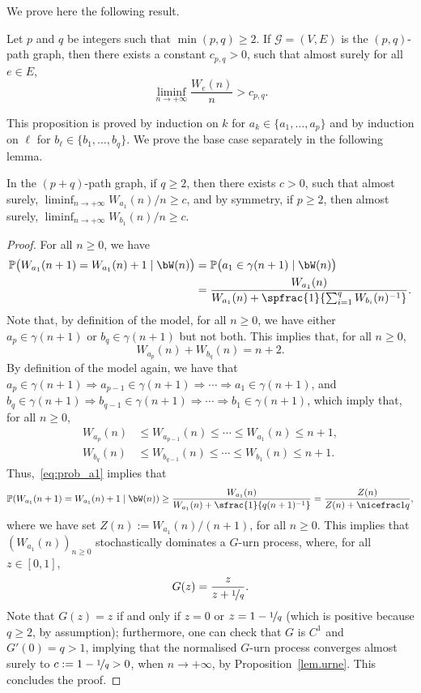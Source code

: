 \label{subsec.2paths.1}
We prove here the following result.

\begin{proposition}\label{prop:multiedges}
Let $p$ and $q$ be integers such that $\min(p, q)\geq 2$.
If $\mathcal G = (V,E)$ is the $(p,q)$-path graph, then there exists a constant $c_{p,q}>0$, such that almost surely for all $e\in E$,
\[
\liminf_{n\to +\infty} \frac{W_e(n)}n> c_{p,q}.
\]
\end{proposition}
This proposition is proved by induction on $k$ for $a_k\in \{a_1, \ldots, a_p\}$ and by induction on $\ell$ for $b_\ell\in \{b_1, \ldots, b_q\}$. We prove the base case separately in the following lemma.
\begin{lemma}\label{lem:liminf_a1}
In the $(p+q)$-path graph, if $q\geq 2$, then there exists $c>0$, such that almost surely, $\liminf_{n\to+\infty} W_{a_1}(n)/n\ge c$, and by symmetry, if $p\geq 2$, then almost surely, $\liminf_{n\to+\infty} W_{b_1}(n)/n\ge c$.
\end{lemma}

\begin{proof}
For all $n\geq 0$, we have
\begin{equation}
\begin{aligned}\label{eq:prob_a1}
\mathbb P\bigl(W_{a_1}(n+1) = W_{a_1}(n)+1 \mid \bW(n)\bigr)
&=\mathbb P\bigl(a_1 \in \gamma(n+1)\mid \bW(n)\bigr)\\
&= \frac{W_{a_1}(n)}{W_{a_1}(n)+
\spfrac{1}{\sum_{i=1}^q W_{b_i}(n)^{-1}}}.
\end{aligned}
\end{equation}
Note that, by definition of the model,
for all $n\geq 0$,
we have either $a_p\in\gamma(n+1)$ or $b_q\in\gamma(n+1)$ but not both.
This implies that, for all $n\geq 0$,
\[
W_{a_p}(n)+W_{b_q}(n)=n+2.
\]
By definition of the model again,
we have that $a_p\in\gamma(n+1)\Rightarrow a_{p-1}\in \gamma(n+1) \Rightarrow \cdots \Rightarrow a_1\in\gamma(n+1)$, and
$b_q\in\gamma(n+1)\Rightarrow b_{q-1}\in\gamma(n+1)\Rightarrow \cdots \Rightarrow b_1\in\gamma(n+1)$, which imply that, for all $n\geq 0$,
\begin{align*}
W_{a_p}(n)&\leq W_{a_{p-1}}(n)\leq \cdots \leq W_{a_1}(n)\leq n+1,\\
\tag*{and}
W_{b_q}(n)&\leq W_{b_{q-1}}(n)\leq\cdots \leq W_{b_1}(n)\leq n+1.
\end{align*}
Thus,~\eqref{eq:prob_a1} implies that
\[
\mathbb P(W_{a_1}(n+1) = W_{a_1}(n)+1 \mid \bW(n))
\geq \frac{W_{a_1}(n)}{W_{a_1}(n)+\sfrac{1}{q(n+1)^{-1}}}
=\frac{Z(n)}{Z(n)+\nicefrac 1q},
\]
where we have set $Z(n):=W_{a_1}(n)/(n+1)$, for all $n\geq 0$.
This implies that $(W_{a_1}(n))_{n\ge 0}$ stochastically dominates a $G$-urn process,
where, for all $z\in[0,1]$,
\[
G(z) = \frac{z}{z+\nicefrac1{q}}.
\]
Note that $G(z) = z$ if and only if $z=0$ or $z=1-{\nicefrac1q}$
(which is positive because $q\geq 2$, by assumption);
furthermore, one can check that $G$ is $C^1$ and $G'(0) = q > 1$,
implying that the normalised $G$-urn process converges almost surely to $c:= 1-\nicefrac1q>0$, when $n\to+\infty$, by Proposition~\ref{lem.urne}.
This concludes the proof.
\end{proof}

